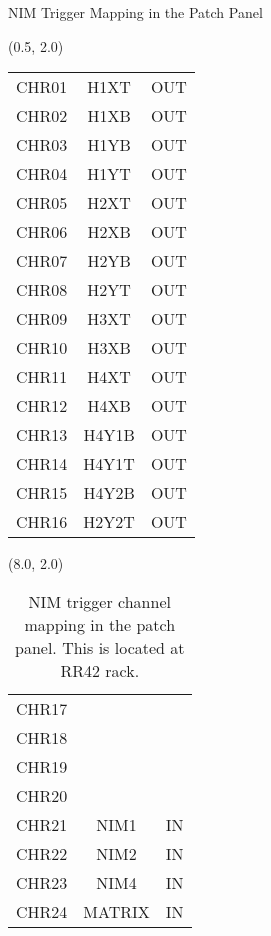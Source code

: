 \documentclass[10pt, xcolor={dvipsnames}, aspectratio = 169, sans,mathserif]{beamer}
\begin{document}
\begin{frame}{NIM Trigger Mapping in the Patch Panel}

\begin{textblock}{7.0}(0.5, 2.0)
\begin{table}
\begin{center}
\begin{tabular}{|c|c|c|}
\hline
\rowcolor{red!20}
CHR01 & H1XT & OUT \\
\rowcolor{red!20}
CHR02 & H1XB & OUT \\
\rowcolor{red!20}
CHR03 & H1YB & OUT \\
\rowcolor{red!20}
CHR04 & H1YT & OUT \\
\rowcolor{red!20}
CHR05 & H2XT & OUT \\
\rowcolor{red!20}
CHR06 & H2XB & OUT \\
\rowcolor{red!20}
CHR07 & H2YB & OUT \\
\rowcolor{red!20}
CHR08 & H2YT & OUT \\
\rowcolor{red!20}
CHR09 & H3XT & OUT \\
\rowcolor{red!20}
CHR10 & H3XB & OUT \\
\rowcolor{red!20}
CHR11 & H4XT & OUT \\
\rowcolor{red!20}
CHR12 & H4XB & OUT \\
\rowcolor{red!20}
CHR13 & H4Y1B & OUT \\
\rowcolor{red!20}
CHR14 & H4Y1T & OUT \\
\rowcolor{red!20}
CHR15 & H4Y2B & OUT \\
\rowcolor{red!20}
CHR16 & H2Y2T & OUT \\
\hline
\end{tabular}
\end{center}
\end{table}
\end{textblock}

\begin{textblock}{7.0}(8.0, 2.0)
\begin{table}
\begin{center}
\begin{tabular}{|c|c|c|}
\hline
CHR17 &       &     \\
CHR18 &       &     \\
CHR19 &       &     \\
CHR20 &       &     \\
\rowcolor{lime!20}
CHR21 & NIM1 & IN \\
\rowcolor{lime!20}
CHR22 & NIM2 & IN \\
\rowcolor{lime!20}
CHR23 & NIM4 & IN \\
\rowcolor{lime!20}
CHR24 & MATRIX & IN \\
\hline
\end{tabular}
\caption{NIM trigger channel mapping in the patch panel. This is located at RR42 rack.}
\end{center}
\end{table}
\end{textblock}

\end{frame}
\end{document}
